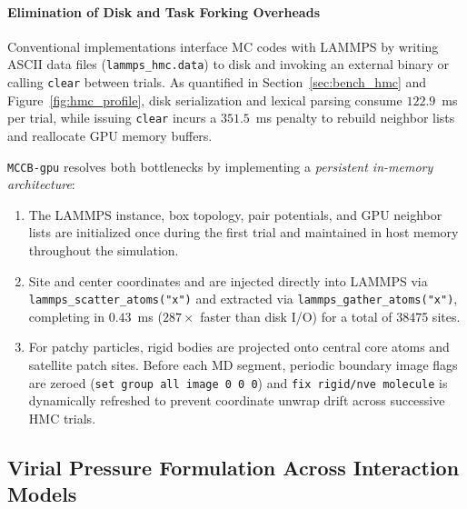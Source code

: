 \documentclass[final,5p,times,twocolumn]{elsarticle}
\begin{document}
\paragraph{Elimination of Disk and Task Forking Overheads}
Conventional implementations interface MC codes with LAMMPS by writing
ASCII data files (\texttt{lammps\_hmc.data}) to disk and invoking an
external binary or calling \texttt{clear} between trials. As
quantified in Section~\ref{sec:bench_hmc} and
Figure~\ref{fig:hmc_profile}, disk serialization and lexical parsing
consume $122.9$~ms per trial, while issuing \texttt{clear} incurs a
$351.5$~ms penalty to rebuild neighbor lists and reallocate GPU memory
buffers. 

\texttt{MCCB-gpu} resolves both bottlenecks by implementing a \textit{persistent in-memory architecture}:
\begin{enumerate}
    \item The LAMMPS instance, box topology, pair potentials, and GPU neighbor lists are initialized once during the first trial and maintained in host memory throughout the simulation.
    \item Site and center  coordinates and are injected directly into LAMMPS via
      \texttt{lammps\_scatter\_atoms("x")} and extracted via
      \texttt{lammps\_gather\_atoms("x")}, completing in $0.43$~ms
      ($287\times$ faster than disk I/O) for a total of 38475 sites. 
    \item For patchy particles, rigid bodies are projected onto
      central core atoms and satellite patch sites. Before each MD
      segment, periodic boundary image flags are zeroed (\texttt{set
        group all image 0 0 0}) and \texttt{fix rigid/nve molecule} is
      dynamically refreshed to prevent coordinate unwrap drift across
      successive HMC trials. 
\end{enumerate}

\subsection{Virial Pressure Formulation Across Interaction Models}
\label{sec:algo_virial}
\end{document}
